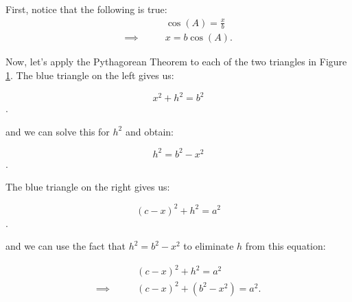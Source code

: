\begin{figure}[htpb]
	\centering


	\caption{}
	\label{fig:non_right_triangle_split_into_two_right_triangles_2}
\end{figure}

First, notice that the following is true:
\begin{align*}
  \qquad&\cos (A) = \frac{x}{b} \\
  \implies\qquad&x = b\cos (A)
.\end{align*}

Now, let's apply the Pythagorean Theorem to each of the two triangles in Figure
\ref{fig:non_right_triangle_split_into_two_right_triangles_2}. The blue triangle
on the left gives us:

\[ x^{2} + h^{2} = b^{2} \].

and we can solve this for $h^{2}$ and obtain:

\[ h^{2} = b^{2} - x^{2} \].

The blue triangle on the right gives us:

\[ (c - x)^{2} + h^{2} = a^{2} \].

and we can use the fact that $h^{2} = b^{2} - x^{2}$ to eliminate $h$ from this
equation:

\begin{align*}
  \qquad&(c - x)^{2} + h^{2} = a^{2} \\
  \implies\qquad&(c - x)^{2} + (b^{2} - x^{2}) = a^{2}
.\end{align*}

